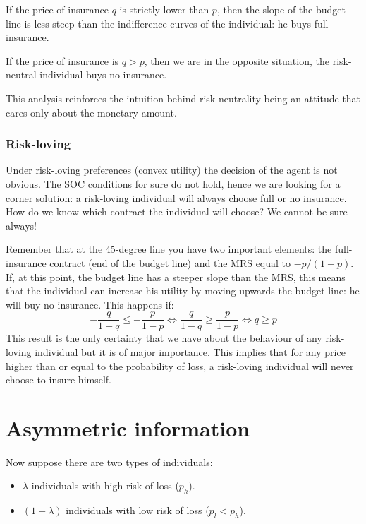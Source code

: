 \documentclass[12pt]{report}
\begin{document}
If the price of insurance $q$ is strictly lower than $p$, then the slope of the budget line is less steep than the indifference curves of the individual: he buys full insurance.

If the price of insurance is $q > p$, then we are in the opposite situation, the risk-neutral individual buys no insurance.

This analysis reinforces the intuition behind risk-neutrality being an attitude that cares only about the monetary amount.   

\subsubsection{Risk-loving}

Under risk-loving preferences (convex utility) the decision of the agent is not obvious. The SOC conditions for sure do not hold, hence we are looking for a corner solution: a risk-loving individual will always choose full or no insurance. How do we know which contract the individual will choose? We cannot be sure always!

Remember that at the 45-degree line you have two important elements: the full-insurance contract (end of the budget line) and the MRS equal to $-p/(1-p)$. If, at this point, the budget line has a steeper slope than the MRS, this means that the individual can increase his utility by moving upwards the budget line: he will buy no insurance. This happens if: $$-\frac{q}{1-q} \leq -\frac{p}{1-p} \Leftrightarrow \frac{q}{1-q} \geq \frac{p}{1-p} \Leftrightarrow q\geq p$$ This result is the only certainty that we have about the behaviour of any risk-loving individual but it is of major importance. This implies that for any price higher than or equal to the probability of loss, a risk-loving individual will never choose to insure himself.

\section{Asymmetric information}

Now suppose there are two types of individuals:\begin{itemize}
\item $\lambda$ individuals with high risk of loss ($p_h$).
\item $(1-\lambda)$ individuals with low risk of loss ($p_l<p_h$).
\end{itemize}
\end{document}
